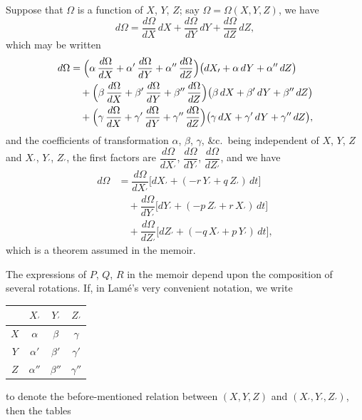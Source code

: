 \documentclass[12pt,a4paper]{article}
\theoremstyle{plain}
\begin{document}
\medskip
Suppose that $\Omega$ is a function of $X$, $Y$, $Z$; say $\Omega=\Omega(X,Y,Z)$, we have
\[
d\Omega=\dfrac{d\Omega}{dX}\,dX+\dfrac{d\Omega}{dY}\,dY+\dfrac{d\Omega}{dZ}\,dZ,
\]
which may be written
\begin{align*}
d\Omega &= \Bigl(\alpha\,\dfrac{d\Omega}{dX}+\alpha'\,\dfrac{d\Omega}{dY}+\alpha''\,\dfrac{d\Omega}{dZ}\Bigr)\bigl(dX_{\prime}+\alpha\,dY+\alpha''\,dZ\bigr)\\
&\quad +\Bigl(\beta\,\dfrac{d\Omega}{dX}+\beta'\,\dfrac{d\Omega}{dY}+\beta''\,\dfrac{d\Omega}{dZ}\Bigr)\bigl(\beta\,dX+\beta'\,dY+\beta''\,dZ\bigr)\\
&\quad +\Bigl(\gamma\,\dfrac{d\Omega}{dX}+\gamma'\,\dfrac{d\Omega}{dY}+\gamma''\,\dfrac{d\Omega}{dZ}\Bigr)\bigl(\gamma\,dX+\gamma'\,dY+\gamma''\,dZ\bigr),
\end{align*}
and the coefficients of transformation $\alpha$, $\beta$, $\gamma$, \&c.\ being independent of $X$, $Y$, $Z$ and $X_{\prime}$, $Y_{\prime}$, $Z_{\prime}$, the first factors are $\dfrac{d\Omega}{dX_{\prime}}$, $\dfrac{d\Omega}{dY_{\prime}}$, $\dfrac{d\Omega}{dZ_{\prime}}$, and we have
\begin{align*}
d\Omega &= \dfrac{d\Omega}{dX_{\prime}}\bigl[dX_{\prime}+(-r\,Y_{\prime}+q\,Z_{\prime})\,dt\bigr]\\
&\quad +\dfrac{d\Omega}{dY_{\prime}}\bigl[dY_{\prime}+(-p\,Z_{\prime}+r\,X_{\prime})\,dt\bigr]\\
&\quad +\dfrac{d\Omega}{dZ_{\prime}}\bigl[dZ_{\prime}+(-q\,X_{\prime}+p\,Y_{\prime})\,dt\bigr],
\end{align*}
which is a theorem assumed in the memoir.

\medskip
The expressions of $P$, $Q$, $R$ in the memoir depend upon the composition of several rotations. If, in Lam\'e's very convenient notation, we write

\begin{center}
\begin{tabular}{|c|c|c|c|}
\hline
       & $X_{\prime}$ & $Y_{\prime}$ & $Z_{\prime}$ \\
\hline
$X$    & $\alpha$     & $\beta$      & $\gamma$ \\
$Y$    & $\alpha'$    & $\beta'$     & $\gamma'$ \\
$Z$    & $\alpha''$   & $\beta''$    & $\gamma''$ \\
\hline
\end{tabular}
\end{center}

\newpage
{} to denote the before-mentioned relation between $(X,Y,Z)$ and $(X_{\prime},Y_{\prime},Z_{\prime})$, then the tables
\end{document}
